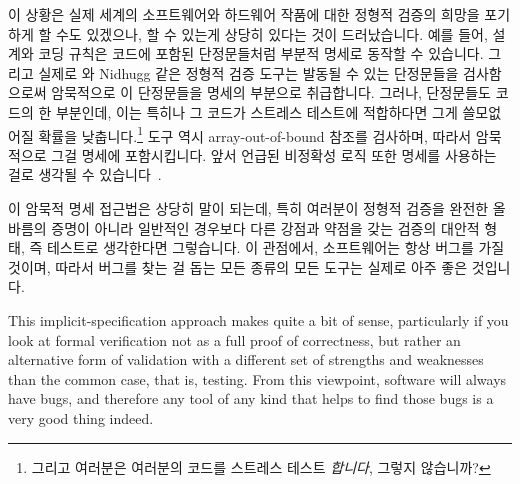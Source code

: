 \fi

이 상황은 실제 세계의 소프트웨어와 하드웨어 작품에 대한 정형적 검증의 희망을
포기하게 할 수도 있겠으나, 할 수 있는게 상당히 있다는 것이 드러났습니다.
예를 들어, 설계와 코딩 규칙은 코드에 포함된 단정문들처럼 부분적 명세로 동작할
수 있습니다.
그리고 실제로  와 Nidhugg 같은 정형적 검증 도구는 발동될 수 있는
단정문들을 검사함으로써 암묵적으로 이 단정문들을 명세의 부분으로 취급합니다.
그러나, 단정문들도 코드의 한 부분인데, 이는 특히나 그 코드가 스트레스 테스트에
적합하다면 그게 쓸모없어질 확률을 낮춥니다.\footnote{
	그리고 여러분은 여러분의 코드를 스트레스 테스트 \emph{합니다}, 그렇지
	않습니까?}
 도구 역시 array-out-of-bound 참조를 검사하며, 따라서 암묵적으로 그걸
명세에 포함시킵니다.
앞서 언급된 비정확성 로직 또한 명세를 사용하는 걸로 생각될 수
있습니다~\cite{PeterWOHearn2019incorrectnessLogic}.

\iffalse

This situation might cause one to give up all hope of formal verification
of real-world software and hardware artifacts, but it turns out that there is
quite a bit that can be done.
For example, design and coding rules can act as a partial specification,
as can assertions contained in the code.
And in fact formal-verification tools such as \co{cbmc} and Nidhugg
both check for assertions that can be triggered, implicitly treating
these assertions as part of the specification.
However, the assertions are also part of the code, which makes it less
likely that they will become obsolete, especially if the code is
also subjected to stress tests.\footnote{
	And you \emph{do} stress-test your code, don't you?}
The \co{cbmc} tool also checks for array-out-of-bound references,
thus implicitly adding them to the specification.
The aforementioned incorrectness logic can also be thought of as using
an implicit bugs-not-present
specification~\cite{PeterWOHearn2019incorrectnessLogic}.

\fi

이 암묵적 명세 접근법은 상당히 말이 되는데, 특히 여러분이 정형적 검증을 완전한
올바름의 증명이 아니라 일반적인 경우보다 다른 강점과 약점을 갖는 검증의 대안적
형태, 즉 테스트로 생각한다면 그렇습니다.
이 관점에서, 소프트웨어는 항상 버그를 가질 것이며, 따라서 버그를 찾는 걸 돕는
모든 종류의 모든 도구는 실제로 아주 좋은 것입니다.

\iffalse

This implicit-specification approach makes quite a bit of sense, particularly
if you look at formal verification not as a full proof of correctness,
but rather an alternative form of validation with a different set of
strengths and weaknesses than the common case, that is, testing.
From this viewpoint, software will always have bugs, and therefore any
tool of any kind that helps to find those bugs is a very good thing
indeed.


